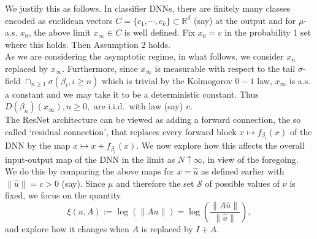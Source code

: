 \documentclass[10pt,a4paper]{amsart}
\newtheorem{lemma}[theorem]{Lemma}
\newcommand{\R}{\mathbb{R}}
\newcommand{\PA}{\mathcal{P}}
\newcommand{\SA}{\mathcal{S}}
\newcommand{\0}{\textbf{0}}
\newcommand{\HA}{\mathcal{H}}
\begin{document}
We justify this as follows. In classifier DNNs, there are finitely many classes encoded as euclidean vectors $C = \{c_1, \cdots , c_k\} \subset \R^d$ (say) at the output and for $\mu$-a.s. $x_0$, the above limit $x_\infty \in C$ is well defined. Fix $x_0 = v$ in the probability $1$ set where this holds. Then Assumption 2 holds.\\

As we are considering the asymptotic regime, in what follows, we consider $x_n$ replaced by $x_\infty$. Furthermore, since $x_\infty$ is measurable with respect to the tail $\sigma$-field $\cap_{n \geq 1}\sigma(\beta_i, i \geq n)$ which is trivial by the Kolmogorov $0-1$ law, $x_\infty$ is a.s. a constant and we may take it to be a deterministic constant. Thus $D(\beta_n)(x_\infty), n \geq 0,$ are i.i.d.\ with law (say) $\upsilon$.\\

The ResNet architecture can be viewed as adding a forward connection, the so called `residual connection', that replaces every forward block $x \mapsto f_{\beta_i}(x)$ of the DNN by the map $x \mapsto x + f_{\beta_i}(x)$. We now explore how this affects the overall input-output map of the DNN in the limit as $N \uparrow \infty$, in view of the foregoing.\\

We do this by comparing the above maps for $x = \hat{u}$ as defined earlier with $\|\hat{u}\| = c > 0$ (say).  Since $\mu$ and therefore the set $\SA$ of possible values of $\nu$ is fixed, we focus on the quantity 
$$\xi(u, A) := \log(\|Au\|) = \log\left(\frac{\|A\hat{u}\|}{\|\hat{u}\|}\right),$$
and explore how it changes when $A$ is replaced by $I + A$.  \\

%
%
%
\end{document}
